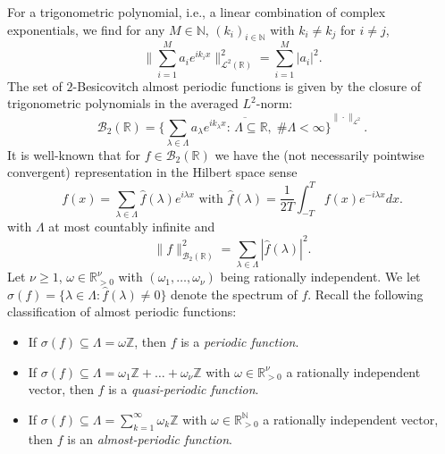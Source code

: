 \documentclass{amsart}
\theoremstyle{definition}
\newcommand{\R}{\mathbb{R}}
\newcommand{\N}{\mathbb{N}}
\newcommand{\Z}{\mathbb{Z}}
\begin{document}
For a trigonometric polynomial, i.e., a linear combination of complex exponentials, we find for any $M \in \N$, $(k_i)_{i \in \N}$ with $k_i \neq k_j$ for $i \neq j$,
\begin{equation*}
\big\| \sum_{i =1 }^M a_i e^{i k_i x} \big\|_{\mathcal{L}^2(\R)}^2 = \sum_{i = 1}^M |a_i|^2.
\end{equation*}
The set of $2$-Besicovitch almost periodic functions is given by the closure of trigonometric polynomials in the averaged $L^2$-norm:
\begin{equation*}
\mathcal{B}_2(\R) = \overline{\{ \sum_{\lambda \in \Lambda} a_\lambda e^{i k_\lambda x} : \, \Lambda \subseteq \R, \; \# \Lambda < \infty \}}^{\| \cdot \|_{\mathcal{L}^2}}.
\end{equation*}
It is well-known that for $f \in \mathcal{B}_2(\R)$ we have the (not necessarily pointwise convergent) representation in the Hilbert space sense
\begin{equation*}
f(x) = \sum_{\lambda \in \Lambda} \hat{f}(\lambda) e^{i \lambda x} \text{ with } \hat{f}(\lambda) = \frac{1}{2T} \int_{-T}^T f(x) e^{-i \lambda x} dx.
\end{equation*}
with $\Lambda$ at most countably infinite and 
\begin{equation*}
\| f \|^2_{\mathcal{B}_2(\R)} = \sum_{\lambda \in \Lambda} |\hat{f}(\lambda)|^2.
\end{equation*}
Let $\nu \geq 1$, $\omega \in \R^{\nu}_{>0}$ with $(\omega_1,\ldots,\omega_{\nu})$ being rationally independent.
We let $\sigma(f) = \{ \lambda \in \Lambda : \hat{f}(\lambda) \neq 0 \}$ denote the spectrum of $f$. Recall the following classification of almost periodic functions:
\begin{itemize}
\item If $\sigma(f) \subseteq \Lambda = \omega \Z$, then $f$ is a \emph{periodic function}.
\item If $\sigma(f) \subseteq \Lambda = \omega_1 \Z + \ldots + \omega_{\nu} \Z$ with $\omega \in \R^{\nu}_{>0}$ a rationally independent vector, then $f$ is a \emph{quasi-periodic function}.
\item If $\sigma(f) \subseteq \Lambda = \sum_{k=1}^{\infty} \omega_k \Z$ with $\omega \in \R^{\N}_{>0}$ a rationally independent vector, then $f$ is an \emph{almost-periodic function}. 
\end{itemize}
\end{document}
